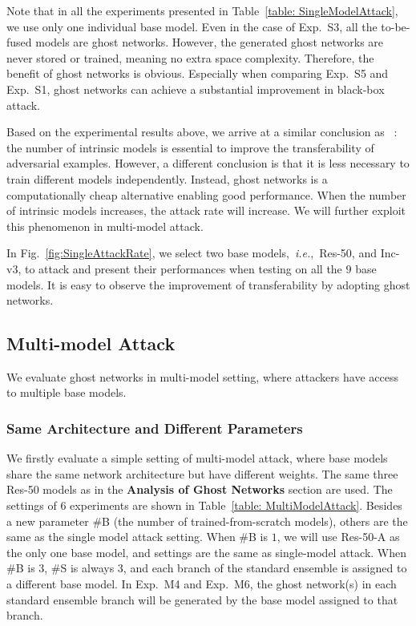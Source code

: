 \documentclass[letterpaper]{article} %
\newcommand{\citet}[1]{\citeauthor{#1} \shortcite{#1}}
\def\ie{\emph{i.e.}}
\begin{document}
Note that in all the experiments presented in Table~\ref{table: SingleModelAttack}, we use only one individual base model. Even in the case of Exp.~S3, all the to-be-fused models are ghost networks. However, the generated ghost networks are never stored or trained, meaning no extra space complexity. Therefore, the benefit of ghost networks is obvious. Especially when comparing Exp.~S5 and Exp.~S1, ghost networks can achieve a substantial improvement in black-box attack.

Based on the experimental results above, we arrive at a similar conclusion as~\citet{liu2016delving}: the number of intrinsic models is essential to improve the transferability of adversarial examples. However, a different conclusion is that it is less necessary to train different models independently. Instead, ghost networks is a computationally cheap alternative enabling good performance. When the number of intrinsic models increases, the attack rate will increase. We will further exploit this phenomenon in multi-model attack.



In Fig.~\ref{fig:SingleAttackRate}, we select two base models,~\ie,~Res-50, and Inc-v3, to attack and present their performances when testing on all the $9$ base models. It is easy to observe the improvement of transferability by adopting ghost networks.



\subsection{Multi-model Attack} \label{sec:multiModelAttackExp}
We evaluate ghost networks in multi-model setting, where attackers have access to multiple base models.


\subsubsection{Same Architecture and Different Parameters}
We firstly evaluate a simple setting of multi-model attack, where base models share the same network architecture but have different weights. The same three Res-50 models as in the \textbf{Analysis of Ghost Networks} section are used. The settings of $6$ experiments are shown in Table~\ref{table: MultiModelAttack}. Besides a new parameter \#B (the number of trained-from-scratch models), others are the same as the single model attack setting. When \#B is $1$, we will use Res-50-A as the only one base model, and settings are the same as single-model attack. When \#B is $3$, \#S is always $3$, and each branch of the standard ensemble is assigned to a different base model. In Exp.~M4 and Exp.~M6, the ghost network(s) in each standard ensemble branch will be generated by the base model assigned to that branch.
\end{document}
